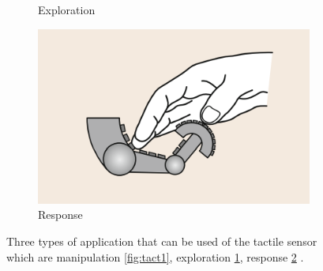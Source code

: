 \documentclass[USenglish]{ifimaster}  %
\begin{document}
\begin{figure}
\begin{subfigure}[b]{0.32\textwidth}
		\caption{Exploration}
		\label{fig:tact2}
	\end{subfigure}\hfill
	\begin{subfigure}[b]{0.32\textwidth}
		\centering
		\includegraphics[width=\linewidth]{Figures/tactiles3}
		\caption{Response}
		\label{fig:tact3}
	\end{subfigure}\hfill
	\caption[Applications of the tactile sensor]{Three types of application that can be used of the tactile sensor which are manipulation  \ref{fig:tact1}, exploration \ref{fig:tact2}, response \ref{fig:tact3} \cite{Cutkosky2008}.}
	\label{fig:tactiles}
\end{figure}

\FloatBarrier
\end{document}
